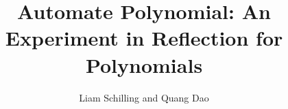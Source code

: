 \documentclass[a4paper]{article}
\title{Automate Polynomial: An Experiment in Reflection for Polynomials}
\author{Liam Schilling and Quang Dao}
\begin{document}
\maketitle
\begin{abstract}

\end{abstract}

\end{document}
